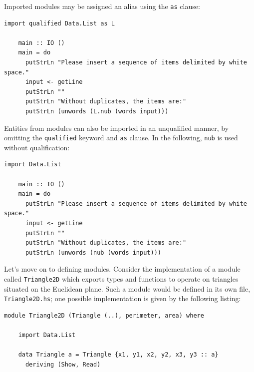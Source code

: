 \documentclass[UdineBachThesis,american,11pt]{PhdThesis}
\begin{document}
  Imported modules may be assigned an alias using the \mbox{\texttt{as}} clause:

  \begin{Verbatim}[gobble=4,fontsize=\small]
    import qualified Data.List as L

    main :: IO ()
    main = do
      putStrLn "Please insert a sequence of items delimited by white space."
      input <- getLine
      putStrLn ""
      putStrLn "Without duplicates, the items are:"
      putStrLn (unwords (L.nub (words input)))
  \end{Verbatim}

  Entities from modules can also be imported in an unqualified manner, by
  omitting the \mbox{\texttt{qualified}} keyword and \mbox{\texttt{as}} clause.
  In the following, \mbox{\texttt{nub}} is used without qualification:

  \begin{Verbatim}[gobble=4,fontsize=\small]
    import Data.List

    main :: IO ()
    main = do
      putStrLn "Please insert a sequence of items delimited by white space."
      input <- getLine
      putStrLn ""
      putStrLn "Without duplicates, the items are:"
      putStrLn (unwords (nub (words input)))
  \end{Verbatim}

  Let's move on to defining modules. Consider the implementation of a module
  called \mbox{\texttt{Triangle2D}} which exports types and functions to operate
  on triangles situated on the Euclidean plane. Such a module would be defined
  in its own file, \mbox{\texttt{Triangle2D.hs}}; one possible implementation is
  given by the following listing:

  \begin{Verbatim}[gobble=4,fontsize=\small]
    module Triangle2D (Triangle (..), perimeter, area) where

    import Data.List

    data Triangle a = Triangle {x1, y1, x2, y2, x3, y3 :: a}
      deriving (Show, Read)
  \end{Verbatim}

  \pagebreak
\end{document}
